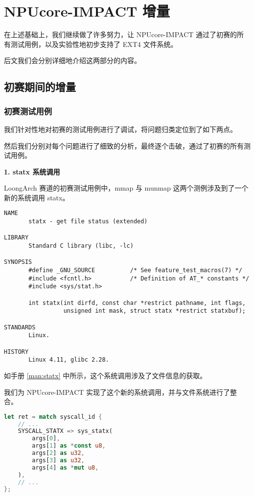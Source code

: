 \chapter{NPUcore-IMPACT 增量}

在上述基础上，我们继续做了许多努力，让 NPUcore-IMPACT 通过了初赛的所有测试用例，以及实验性地初步支持了 EXT4 文件系统。

后文我们会分别详细地介绍这两部分的内容。

\section{初赛期间的增量}

\subsection{初赛测试用例}

我们针对性地对初赛的测试用例进行了调试，将问题归类定位到了如下两点。

然后我们分别对每个问题进行了细致的分析，最终逐个击破，通过了初赛的所有测试用例。

\textbf{1. statx 系统调用}

LoongArch 赛道的初赛测试用例中，mmap 与 munmap 这两个测例涉及到了一个新的系统调用 statx。

\begin{lstlisting}[label={man:statx}, caption={statx 手册}]
NAME
       statx - get file status (extended)

LIBRARY
       Standard C library (libc, -lc)

SYNOPSIS
       #define _GNU_SOURCE          /* See feature_test_macros(7) */
       #include <fcntl.h>           /* Definition of AT_* constants */
       #include <sys/stat.h>

       int statx(int dirfd, const char *restrict pathname, int flags,
                 unsigned int mask, struct statx *restrict statxbuf);

STANDARDS
       Linux.

HISTORY
       Linux 4.11, glibc 2.28.
\end{lstlisting}

如手册 \ref{man:statx} 中所示，这个系统调用涉及了文件信息的获取。

我们为 NPUcore-IMPACT 实现了这个新的系统调用，并与文件系统进行了整合。

\begin{lstlisting}[language={Rust}, caption={statx 系统调用入口}]
let ret = match syscall_id {
    // ...
    SYSCALL_STATX => sys_statx(
        args[0],
        args[1] as *const u8,
        args[2] as u32,
        args[3] as u32,
        args[4] as *mut u8,
    ),
    // ...
};
\end{lstlisting}

